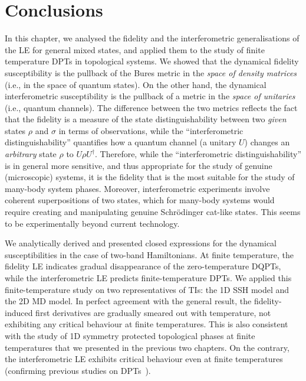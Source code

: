 \section{Conclusions}

In this chapter, we analysed the fidelity and the interferometric generalisations of the LE for general mixed states, and applied them to the study of finite temperature DPTs in topological systems.
We showed that the dynamical fidelity susceptibility is the pullback of the Bures metric in the \emph{space of density matrices} (i.e., in the space of quantum states). On the other hand, the dynamical interferometric susceptibility is the pullback of a metric in the \emph{space of unitaries} (i.e., quantum channels). 
The difference between the two metrics reflects the fact that the fidelity is a measure of the state distinguishability between two {\em given} states $\rho$ and $\sigma$ in terms of observations, while the ``interferometric distinguishability'' quantifies how a quantum channel (a unitary $U$) changes an {\em arbitrary} state $\rho$ to $U \rho U^{\dagger}$. 
Therefore, while the ``interferometric distinguishability'' is in general more sensitive, and thus appropriate for the study of genuine (microscopic) systems, it is the fidelity that is the most suitable for the study of many-body system phases.
Moreover, interferometric experiments involve coherent superpositions of two states, which for many-body systems would require creating and manipulating genuine Schr\"{o}dinger cat-like states. This seems to be experimentally beyond current technology.

We analytically derived and presented closed expressions for the dynamical susceptibilities in the case of two-band Hamiltonians. At finite temperature, the fidelity LE indicates gradual disappearance of the zero-temperature DQPTs, while the interferometric LE predicts finite-temperature DPTs. We  applied this finite-temperature study on two representatives of TIs: the 1D SSH model and the 2D MD model. In perfect agreement with the general result, the fidelity-induced first derivatives are gradually smeared out with temperature, not exhibiting any critical behaviour at finite temperatures. This is also consistent with the study of 1D symmetry protected topological phases at finite temperatures that we presented in the previous two chapters. On the contrary, the interferometric LE exhibits critical behaviour even at finite temperatures (confirming previous studies on DPTs~\cite{hey:bud:17, bah:ban:dut:17}).
%
%
%
%
%
%
%
